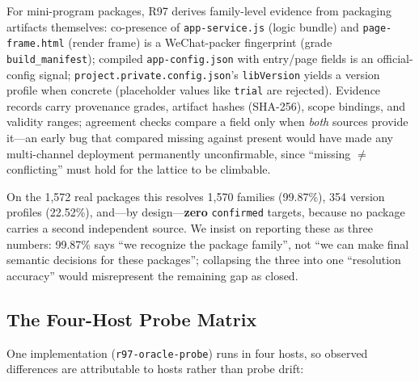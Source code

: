 \documentclass[sigconf,nonacm]{acmart}
\begin{document}
For mini-program packages, R97 derives family-level evidence from packaging artifacts themselves: co-presence of \texttt{app-service.js} (logic bundle) and \texttt{page-frame.html} (render frame) is a WeChat-packer fingerprint (grade \texttt{build\_manifest}); compiled \texttt{app-config.json} with entry/page fields is an official-config signal; \texttt{project.private.config.json}'s \texttt{libVersion} yields a version profile when concrete (placeholder values like \texttt{trial} are rejected). Evidence records carry provenance grades, artifact hashes (SHA-256), scope bindings, and validity ranges; agreement checks compare a field only when \emph{both} sources provide it---an early bug that compared missing against present would have made any multi-channel deployment permanently unconfirmable, since ``missing $\neq$ conflicting'' must hold for the lattice to be climbable.

On the 1{,}572 real packages this resolves 1{,}570 families (99.87\%), 354 version profiles (22.52\%), and---by design---\textbf{zero} \texttt{confirmed} targets, because no package carries a second independent source. We insist on reporting these as three numbers: 99.87\% says ``we recognize the package family'', not ``we can make final semantic decisions for these packages''; collapsing the three into one ``resolution accuracy'' would misrepresent the remaining gap as closed.

\subsection{The Four-Host Probe Matrix}\label{sec:probe}

One implementation (\texttt{r97-oracle-probe}) runs in four hosts, so observed differences are attributable to hosts rather than probe drift:
\end{document}

